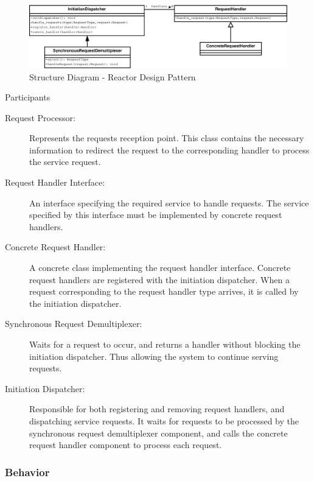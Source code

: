 \begin{figure}
	\centering
	\includegraphics*[width=1\textwidth, keepaspectratio=false]{fig/image4.eps}
	\caption{Structure Diagram - Reactor Design Pattern}
	\label{fig:str_diagram_r}
\end{figure}


\begin{description}
	\item[Participants]
\end{description}

\begin{description}
	\item[Request Processor:]
	Represents the requests reception point. This class contains the necessary information to redirect the request to the corresponding handler to process the service request.
	
	\item[Request Handler Interface:]
	An interface specifying the required service to handle requests. The service specified by this interface must be implemented by concrete request handlers. 
	
	\item[Concrete Request Handler:]
	A concrete class implementing the request handler interface.  Concrete request handlers are registered with the initiation dispatcher. When a request corresponding to the request handler type arrives, it is called by the initiation dispatcher.
	
	\item[Synchronous Request Demultiplexer:]
	Waits for a request to occur, and returns a handler without blocking the initiation dispatcher. Thus allowing the system to continue serving requests.
	
	\item[Initiation Dispatcher:]
	Responsible for both registering and removing request handlers, and dispatching service requests. It waits for requests to be processed by the synchronous request demultiplexer component, and calls the concrete request handler component to process each request.
\end{description}

\subsubsection{Behavior}

